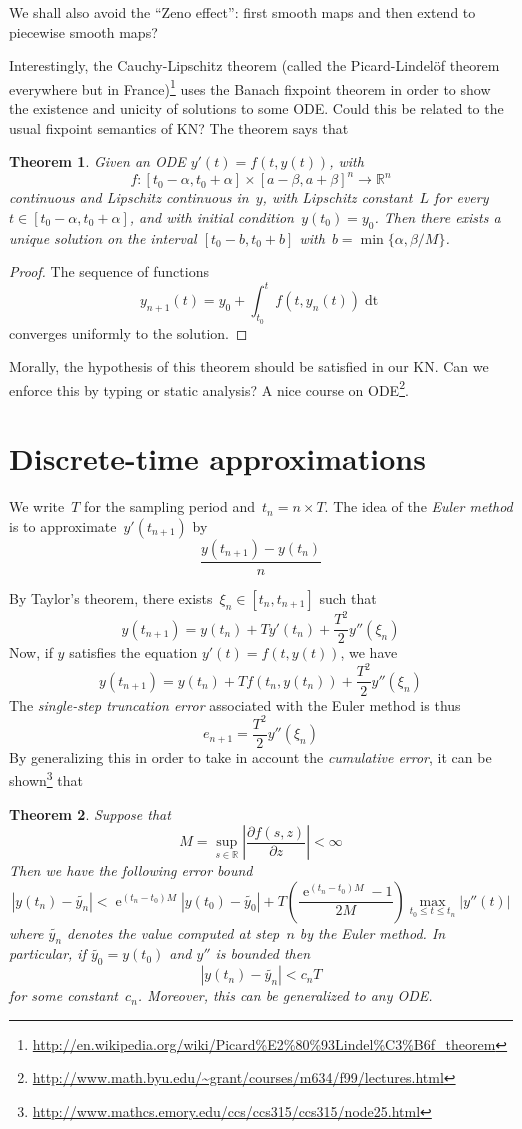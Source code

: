 \documentclass{article}
\newtheorem{theorem}{Theorem}
\newcommand{\ce}{\mathop{\mathrm{e}}}
\newcommand{\dd}[1]{\mathop{\mathrm{d}#1}}
\newcommand{\R}{\mathbb{R}}
\begin{document}
We shall also avoid the ``Zeno effect'': first smooth maps and then extend to
piecewise smooth maps?

Interestingly, the Cauchy-Lipschitz theorem (called the Picard-Lindelöf theorem
everywhere but in
France)\footnote{\url{http://en.wikipedia.org/wiki/Picard\%E2\%80\%93Lindel\%C3\%B6f_theorem}}
uses the Banach fixpoint theorem in order to show the existence and unicity of
solutions to some ODE. Could this be related to the usual fixpoint semantics
of KN? The theorem says that

\begin{theorem}
  Given an ODE $y'(t)=f(t,y(t))$, with
  \[
  f:[t_0-\alpha,t_0+\alpha]\times[a-\beta,a+\beta]^n\to\R^n
  \]
  continuous and Lipschitz continuous in~$y$, with Lipschitz constant~$L$ for
  every \hbox{$t\in[t_0-\alpha,t_0+\alpha]$}, and with initial
  condition~$y(t_0)=y_0$.  Then there exists a unique solution on the interval
  $[t_0-b,t_0+b]$ with~$b=\min\{\alpha,\beta/M\}$.
\end{theorem}
\begin{proof}
  The sequence of functions
  \[
  y_{n+1}(t)=y_0+\int_{t_0}^tf(t,y_n(t))\dd t
  \]
  converges uniformly to the solution.
\end{proof}

Morally, the hypothesis of this theorem should be satisfied in our KN. Can we
enforce this by typing or static analysis? A nice course on
ODE\footnote{\url{http://www.math.byu.edu/~grant/courses/m634/f99/lectures.html}}.

\section{Discrete-time approximations}
We write~$T$ for the sampling period and~$t_n=n\times T$. The idea of the
\emph{Euler method} is to approximate~$y'(t_{n+1})$ by
\[
\frac{y(t_{n+1})-y(t_n)}n
\]

By Taylor's theorem, there exists~$\xi_n\in[t_n,t_{n+1}]$ such that
\[
y(t_{n+1})=y(t_n)+Ty'(t_n)+\frac{T^2}2 y''(\xi_n)
\]
Now, if $y$ satisfies the equation $y'(t)=f(t,y(t))$, we have
\[
y(t_{n+1})=y(t_n)+Tf(t_n,y(t_n))+\frac{T^2}2 y''(\xi_n)
\]
The \emph{single-step truncation error} associated with the Euler method is thus
\[
e_{n+1}=\frac{T^2}2 y''(\xi_n)
\]
By generalizing this in order to take in account the \emph{cumulative error}, it
can be
shown\footnote{\url{http://www.mathcs.emory.edu/ccs/ccs315/ccs315/node25.html}}
that

\begin{theorem}
  Suppose that
  \[
  M=\sup_{s\in\R}\left|\frac{\partial f(s,z)}{\partial z}\right|<\infty
  \]
  Then we have the following error bound
  \[
  |y(t_n)-\tilde{y_n}|<\ce^{(t_n-t_0)M}|y(t_0)-\tilde{y_0}|+T\left(\frac{\ce^{(t_n-t_0)M}-1}{2M}\right)\max_{t_0\leq t\leq t_n}|y''(t)|
  \]
  where $\tilde{y_n}$ denotes the value computed at step~$n$ by the Euler
  method. In particular, if $\tilde{y_0}=y(t_0)$ and $y''$ is bounded then
  \[
  |y(t_n)-\tilde{y_n}|<c_nT
  \]
  for some constant~$c_n$. Moreover, this can be generalized to any ODE.
\end{theorem}
\end{document}
